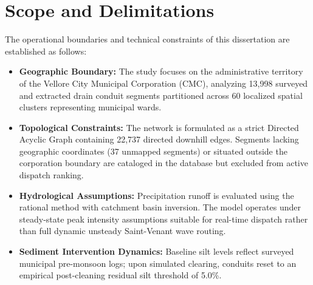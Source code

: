 \section{Scope and Delimitations}
The operational boundaries and technical constraints of this dissertation are established as follows:
\begin{itemize}
    \item \textbf{Geographic Boundary:} The study focuses on the administrative territory of the Vellore City Municipal Corporation (CMC), analyzing 13,998 surveyed and extracted drain conduit segments partitioned across 60 localized spatial clusters representing municipal wards.
    \item \textbf{Topological Constraints:} The network is formulated as a strict Directed Acyclic Graph containing 22,737 directed downhill edges. Segments lacking geographic coordinates (37 unmapped segments) or situated outside the corporation boundary are cataloged in the database but excluded from active dispatch ranking.
    \item \textbf{Hydrological Assumptions:} Precipitation runoff is evaluated using the rational method with catchment basin inversion. The model operates under steady-state peak intensity assumptions suitable for real-time dispatch rather than full dynamic unsteady Saint-Venant wave routing.
    \item \textbf{Sediment Intervention Dynamics:} Baseline silt levels reflect surveyed municipal pre-monsoon logs; upon simulated clearing, conduits reset to an empirical post-cleaning residual silt threshold of 5.0\%.
\end{itemize}

